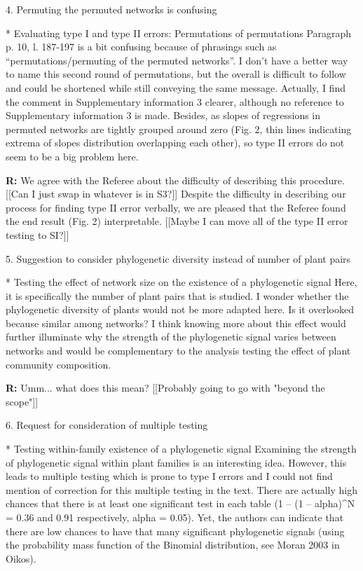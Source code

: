 \documentclass[12pt]{letter}
\newenvironment{refquote}{\bigskip \begin{it}}{\end{it}\smallskip}
\begin{document}
4. Permuting the permuted networks is confusing

	\begin{refquote}
		* Evaluating type I and type II errors: Permutations of permutations
		Paragraph p. 10, l. 187-197 is a bit confusing because of phrasings such as “permutations/permuting of the permuted networks”. I don't have a better way to name this second round of permutations, but the overall is difficult to follow and could be shortened while still conveying the same message.
		Actually, I find the comment in Supplementary information 3 clearer, although no reference to Supplementary information 3 is made.
		Besides, as slopes of regressions in permuted networks are tightly grouped around zero (Fig. 2, thin lines indicating 
		extrema of slopes distribution overlapping each other), so type II errors do not seem to be a big problem here.
	\end{refquote}


	\textbf{R:} We agree with the Referee about the difficulty of describing this procedure. [[Can I just swap in whatever is in S3?]] Despite the difficulty in describing our process for finding type II error verbally, we are pleased that the Referee found the end result (Fig. 2) interpretable. [[Maybe I can move all of the type II error testing to SI?]]


5. Suggestion to consider phylogenetic diversity instead of number of plant pairs

	\begin{refquote}
		* Testing the effect of network size on the existence of a phylogenetic signal
		Here, it is specifically the number of plant pairs that is studied. I wonder whether the phylogenetic diversity of plants would not be more adapted here. Is it overlooked because similar among networks?
		I think knowing more about this effect would further illuminate why the strength of the phylogenetic signal varies between networks and would be complementary to the analysis testing the effect of plant community composition.
	\end{refquote}


	\textbf{R:} Umm... what does this mean? [[Probably going to go with "beyond the scope"]]


6. Request for consideration of multiple testing

	\begin{refquote}
		* Testing within-family existence of a phylogenetic signal
		Examining the strength of phylogenetic signal within plant families is an interesting idea. However, this leads to multiple testing which is prone to type I errors and I could not find mention of correction for this multiple testing in the text. There are actually high chances that there is at least one significant test in each table (1 – (1 – alpha)^N = 0.36 and 0.91 respectively, alpha = 0.05). Yet, the authors can indicate that there are low chances to have that many significant phylogenetic signals (using the probability mass function of the Binomial distribution, see Moran 2003 in Oikos).
	\end{refquote}
\end{document}
